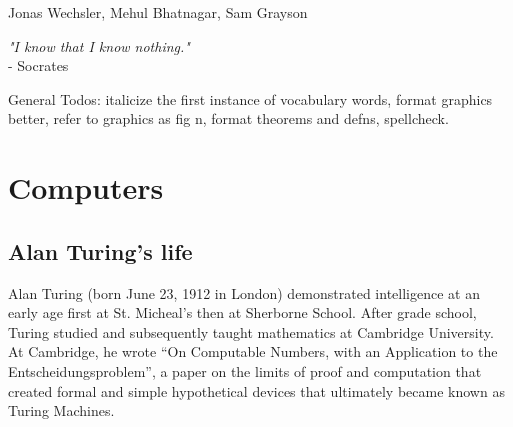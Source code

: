 \documentclass[11pt, letterpaper, twoside, openright]{book}
\begin{document}
\mainmatter

{Jonas Wechsler, Mehul Bhatnagar, Sam Grayson}

\begin{flushright}
\textit{"I know that I know nothing."} \\
- Socrates
\end{flushright}

General Todos: italicize the first instance of vocabulary words, format graphics better, refer to graphics as fig n, format theorems and defns, spellcheck.

\section{Computers}  %
\subsection{Alan Turing's life}

Alan Turing (born June 23, 1912 in London) demonstrated intelligence at an early age first at St. Micheal's then at Sherborne School. After grade school, Turing studied and subsequently taught mathematics at Cambridge University. At Cambridge, he wrote ``On Computable Numbers, with an Application to the Entscheidungsproblem'', a paper on the limits of proof and computation that created formal and simple hypothetical devices that ultimately became known as Turing Machines.

\end{document}
